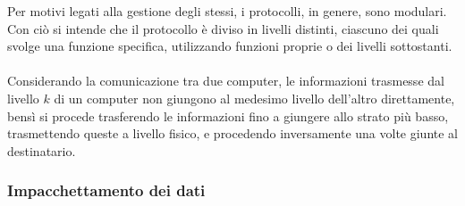 \documentclass{subfiles}
\begin{document}
Per motivi legati alla gestione degli stessi, i protocolli, in genere, sono modulari.
Con ciò si intende che il protocollo è diviso in livelli distinti, ciascuno dei quali svolge una funzione specifica,
utilizzando funzioni proprie o dei livelli sottostanti.
\\ \\
Considerando la comunicazione tra due computer, le informazioni trasmesse dal livello $k$ di un computer non giungono al medesimo livello dell'altro direttamente,
bensì si procede trasferendo le informazioni fino a giungere allo strato più basso,
trasmettendo queste a livello fisico, e procedendo inversamente una volte giunte al destinatario.

\subsubsection{Impacchettamento dei dati}

\end{document}
